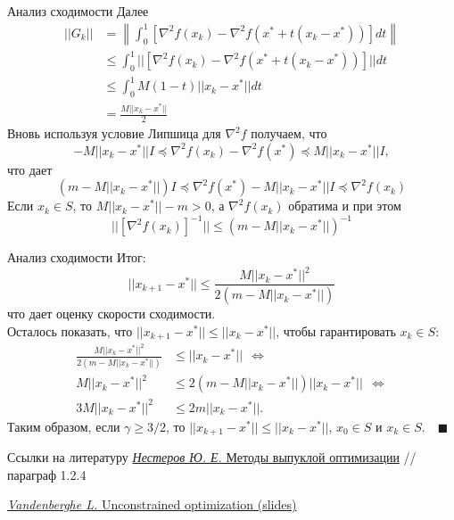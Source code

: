 \documentclass[10pt]{beamer}
\begin{document}
\begin{frame}{Анализ сходимости}
Далее
\begin{align*}
||G_k||&=\left\|\int_0^1[\nabla^2 f(x_k)-\nabla^2 f(x^*+t(x_k-x^*))]dt\right\|\\
&\leq \int_0^1||[\nabla^2 f(x_k)-\nabla^2 f(x^*+t(x_k-x^*))]||dt \\
&\leq \int_0^1M(1-t)||x_k-x^*||dt\\
&=\frac{M||x_k-x^*||}{2}
\end{align*}
\pause
Вновь используя условие Липшица для $\nabla^2 f$ получаем, что 
$$
-M||x_k-x^*||I\preceq\nabla^2 f(x_k)-\nabla^2 f(x^*)\preceq M||x_k-x^*||I,
$$
\pause что дает
$$
(m-M||x_k-x^*||)I\preceq \nabla^2 f(x^*)-M||x_k-x^*||I\preceq \nabla^2 f(x_k)
$$
\pause
Если $x_k\in S$, то $M||x_k-x^*||-m>0$, а $\nabla^2 f(x_k)$ обратима и при этом
$$
||[\nabla^2 f(x_k)]^{-1}||\leq (m-M||x_k-x^*||)^{-1}
$$ 

\end{frame}

\begin{frame}{Анализ сходимости}
Итог:
$$
||x_{k+1}-x^*||\leq \frac{M||x_k-x^*||^2}{2(m-M||x_k-x^*||)}
$$
что дает оценку скорости сходимости.\\
\vspace{1em}
\pause
Осталось показать, что $||x_{k+1}-x^*||\leq ||x_k-x^*||$, чтобы гарантировать $x_k\in S$:
\begin{align*}
\frac{M||x_k-x^*||^2}{2(m-M||x_k-x^*||)}&\leq ||x_k-x^*||~~\Leftrightarrow\\
M||x_k-x^*||^2&\leq 2(m-M||x_k-x^*||)||x_k-x^*||~~\Leftrightarrow\\
3M||x_k-x^*||^2&\leq 2m||x_k-x^*||.
\end{align*}
\pause
Таким образом, если $\gamma\geq 3/2$, то $||x_{k+1}-x^*||\leq ||x_k-x^*||$, $x_0\in S$ и $x_k\in S$.~~$\blacksquare$
\end{frame}

\begin{frame}{Ссылки на литературу}
\href{http://premolab.ru/pub_files/pub5/MnexoB89z7.pdf}{\textit{Нестеров Ю. Е.} Методы выпуклой оптимизации}
 // параграф 1.2.4\\
 \vspace{1em}

\href{https://web.stanford.edu/class/ee364a/lectures/unconstrained.pdf}{\textit{Vandenberghe L.} Unconstrained optimization (slides)}
\end{frame}
\end{document}
